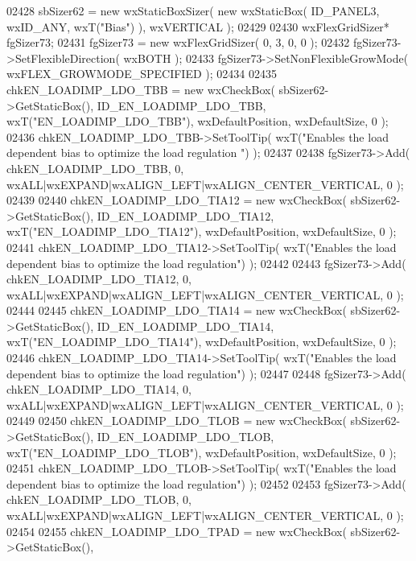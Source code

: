 \begin{DoxyCode}
02428     sbSizer62 = \textcolor{keyword}{new} wxStaticBoxSizer( \textcolor{keyword}{new} wxStaticBox( ID_PANEL3, wxID\_ANY, wxT(\textcolor{stringliteral}{"Bias"}) ), wxVERTICAL );
02429     
02430     wxFlexGridSizer* fgSizer73;
02431     fgSizer73 = \textcolor{keyword}{new} wxFlexGridSizer( 0, 3, 0, 0 );
02432     fgSizer73->SetFlexibleDirection( wxBOTH );
02433     fgSizer73->SetNonFlexibleGrowMode( wxFLEX\_GROWMODE\_SPECIFIED );
02434     
02435     chkEN_LOADIMP_LDO_TBB = \textcolor{keyword}{new} wxCheckBox( sbSizer62->GetStaticBox(), 
      ID_EN_LOADIMP_LDO_TBB, wxT(\textcolor{stringliteral}{"EN\_LOADIMP\_LDO\_TBB"}), wxDefaultPosition, wxDefaultSize, 0 );
02436     chkEN_LOADIMP_LDO_TBB->SetToolTip( wxT(\textcolor{stringliteral}{"Enables the load dependent bias to optimize the load regulation
      "}) );
02437     
02438     fgSizer73->Add( chkEN_LOADIMP_LDO_TBB, 0, wxALL|wxEXPAND|wxALIGN\_LEFT|wxALIGN\_CENTER\_VERTICAL, 0 );
02439     
02440     chkEN_LOADIMP_LDO_TIA12 = \textcolor{keyword}{new} wxCheckBox( sbSizer62->GetStaticBox(), 
      ID_EN_LOADIMP_LDO_TIA12, wxT(\textcolor{stringliteral}{"EN\_LOADIMP\_LDO\_TIA12"}), wxDefaultPosition, wxDefaultSize, 0 );
02441     chkEN_LOADIMP_LDO_TIA12->SetToolTip( wxT(\textcolor{stringliteral}{"Enables the load dependent bias to optimize the load
       regulation"}) );
02442     
02443     fgSizer73->Add( chkEN_LOADIMP_LDO_TIA12, 0, wxALL|wxEXPAND|wxALIGN\_LEFT|wxALIGN\_CENTER\_VERTICAL, 0 );
02444     
02445     chkEN_LOADIMP_LDO_TIA14 = \textcolor{keyword}{new} wxCheckBox( sbSizer62->GetStaticBox(), 
      ID_EN_LOADIMP_LDO_TIA14, wxT(\textcolor{stringliteral}{"EN\_LOADIMP\_LDO\_TIA14"}), wxDefaultPosition, wxDefaultSize, 0 );
02446     chkEN_LOADIMP_LDO_TIA14->SetToolTip( wxT(\textcolor{stringliteral}{"Enables the load dependent bias to optimize the load
       regulation"}) );
02447     
02448     fgSizer73->Add( chkEN_LOADIMP_LDO_TIA14, 0, wxALL|wxEXPAND|wxALIGN\_LEFT|wxALIGN\_CENTER\_VERTICAL, 0 );
02449     
02450     chkEN_LOADIMP_LDO_TLOB = \textcolor{keyword}{new} wxCheckBox( sbSizer62->GetStaticBox(), 
      ID_EN_LOADIMP_LDO_TLOB, wxT(\textcolor{stringliteral}{"EN\_LOADIMP\_LDO\_TLOB"}), wxDefaultPosition, wxDefaultSize, 0 );
02451     chkEN_LOADIMP_LDO_TLOB->SetToolTip( wxT(\textcolor{stringliteral}{"Enables the load dependent bias to optimize the load
       regulation"}) );
02452     
02453     fgSizer73->Add( chkEN_LOADIMP_LDO_TLOB, 0, wxALL|wxEXPAND|wxALIGN\_LEFT|wxALIGN\_CENTER\_VERTICAL, 0 );
02454     
02455     chkEN_LOADIMP_LDO_TPAD = \textcolor{keyword}{new} wxCheckBox( sbSizer62->GetStaticBox(), 

\end{DoxyCode}
